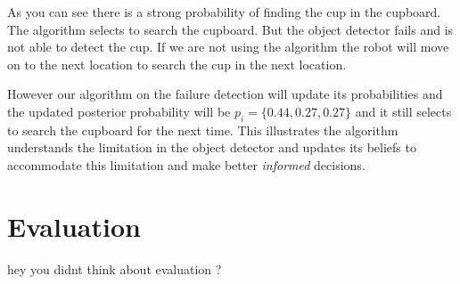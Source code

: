 As you can see there is a strong probability of finding the cup in the cupboard. The algorithm selects to search the cupboard. But the object detector fails and is not able to detect the cup. If we are not using the algorithm the robot will move on to the next location to search the cup in the next location.



However our algorithm on the failure detection will update its probabilities and the updated posterior probability will be $ p_i = \{ 0.44, 0.27, 0.27\}$ and it still selects to search the cupboard for the next time. This illustrates the algorithm understands the limitation in the object detector and updates its beliefs to accommodate this limitation and make better \emph{informed} decisions.  

 
\section{Evaluation}
hey you didnt think about evaluation ? 
